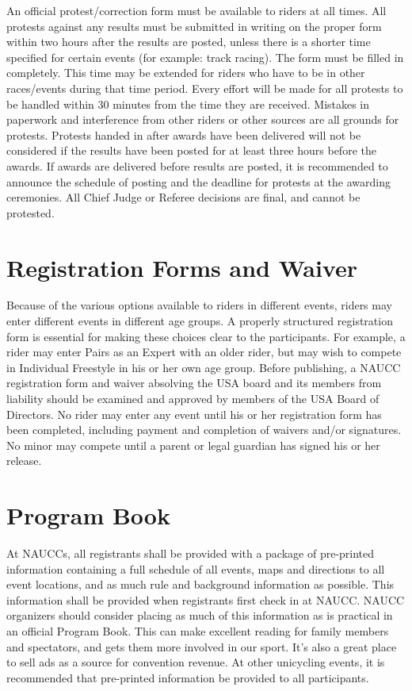 An official protest/correction form must be available to riders at all times.
All protests against any results must be submitted in writing on the proper form within two hours after the results are posted, unless there is a shorter time specified for certain events (for example: track racing).
The form must be filled in completely.
This time may be extended for riders who have to be in other races/events during that time period.
Every effort will be made for all protests to be handled within 30 minutes from the time they are received.
Mistakes in paperwork and interference from other riders or other sources are all grounds for protests.
Protests handed in after awards have been delivered will not be considered if the results have been posted for at least three hours before the awards.
If awards are delivered before results are posted, it is recommended to announce the schedule of posting and the deadline for protests at the awarding ceremonies.
All Chief Judge or Referee decisions are final, and cannot be protested.

\section{Registration Forms and Waiver}
Because of the various options available to riders in different events, riders may enter different events in different age groups.
A properly structured registration form is essential for making these choices clear to the participants.
For example, a rider may enter Pairs as an Expert with an older rider, but may wish to compete in Individual Freestyle in his or her own age group.
Before publishing, a NAUCC registration form and waiver absolving the USA board and its members from liability should be examined and approved by members of the USA Board of Directors.
No rider may enter any event until his or her registration form has been completed, including payment and completion of waivers and/or signatures.
No minor may compete until a parent or legal guardian has signed his or her release.

\section{Program Book}
At NAUCCs, all registrants shall be provided with a package of pre-printed information containing a full schedule of all events, maps and directions to all event locations, and as much rule and background information as possible.
This information shall be provided when registrants first check in at NAUCC.
NAUCC organizers should consider placing as much of this information as is practical in an official Program Book.
This can make excellent reading for family members and spectators, and gets them more involved in our sport.
It's also a great place to sell ads as a source for convention revenue.
At other unicycling events, it is recommended that pre-printed information be provided to all participants.

